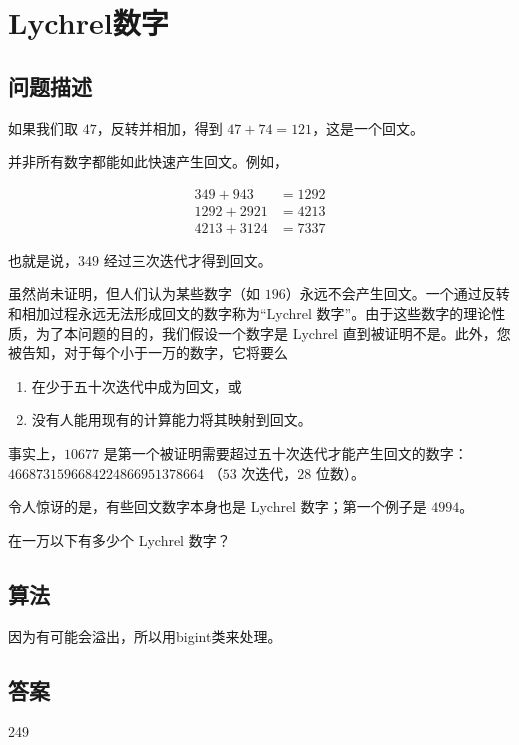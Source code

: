 \section{Lychrel数字}\label{sec:problem55}
\subsection{问题描述}
\begin{tcolorbox}
	如果我们取 $47$，反转并相加，得到 $47 + 74 = 121$，这是一个回文。

	并非所有数字都能如此快速产生回文。例如，

	\begin{align}
		349 + 943   & = 1292 \\
		1292 + 2921 & = 4213 \\
		4213 + 3124 & = 7337
	\end{align}

	也就是说，$349$ 经过三次迭代才得到回文。

	虽然尚未证明，但人们认为某些数字（如 $196$）永远不会产生回文。一个通过反转和相加过程永远无法形成回文的数字称为“Lychrel 数字”。由于这些数字的理论性质，为了本问题的目的，我们假设一个数字是 Lychrel 直到被证明不是。此外，您被告知，对于每个小于一万的数字，它将要么
	\begin{enumerate}[label={(\roman*)}]
		\item 在少于五十次迭代中成为回文，或
		\item 没有人能用现有的计算能力将其映射到回文。
	\end{enumerate}
	事实上，$10677$ 是第一个被证明需要超过五十次迭代才能产生回文的数字：$4668731596684224866951378664$ （$53$ 次迭代，$28$ 位数）。

	令人惊讶的是，有些回文数字本身也是 Lychrel 数字；第一个例子是 $4994$。

	在一万以下有多少个 Lychrel 数字？
\end{tcolorbox}

\subsection{算法}
因为有可能会溢出，所以用bigint类来处理。

\subsection{答案}
249
